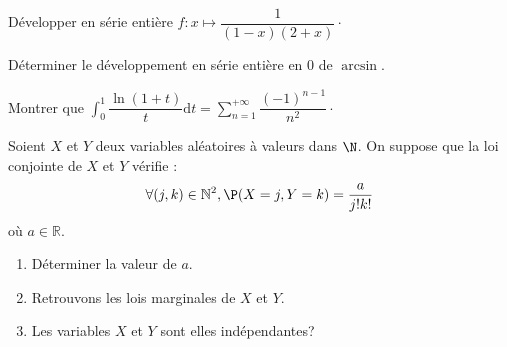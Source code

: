 \documentclass[twoside,a4paper,french,10pt]{VcCours}
\newcommand{\dt}{\text{d}t}
\begin{document}
\begin{Exercice}
  Développer en série entière $f : x \mapsto \dfrac{1}{(1-x)(2+x)} \cdot$
\end{Exercice}

\begin{Exercice}
  Déterminer le développement en série entière en $0$ de $\arcsin$.
\end{Exercice}



\begin{Exercice}
  Montrer que $\int_{0}^1 \dfrac{\ln(1+t)}{t}\dt = \sum_{n=1}^{+ \infty} \dfrac{(-1)^{n-1}}{n^2} \cdot$
\end{Exercice}

\begin{Exercice}
  Soient $X$ et $Y$ deux variables aléatoires à valeurs dans $\N$. On suppose que la loi conjointe de $X$ et $Y$ vérifie :
  \[
  \forall (j,k) \in \mathbb{N}^2,  \P( X = j,Y = k ) = \frac{a}{j!k!}
  \]
où $a \in \mathbb{R}$.
  \begin{enumerate}
  \item
    Déterminer la valeur de $a$.
  \item
    Retrouvons les lois marginales de $X$ et $Y$.
  \item
    Les variables $X$ et $Y$ sont elles indépendantes?
  \end{enumerate}
\end{Exercice}
\end{document}
